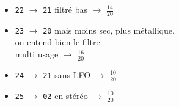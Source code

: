 \documentclass[a4paper, 13pt]{article}
\begin{document}
\begin{itemize}
    \item \texttt{22} $\rightarrow$ \texttt{21} filtré bas $\rightarrow$ \Large{$\frac{14}{20}$} \normalsize \vspace{0.2cm}
    \item \texttt{23} $\rightarrow$ \texttt{20} mais moins sec, plus métallique,\\on entend bien le filtre\\multi usage $\rightarrow$ \Large{$\frac{16}{20}$} \normalsize \vspace{0.2cm}
    \item \texttt{24} $\rightarrow$ \texttt{21} sans LFO $\rightarrow$ \Large{$\frac{10}{20}$} \normalsize \vspace{0.2cm}
    \item \texttt{25} $\rightarrow$ \texttt{02} en stéréo $\rightarrow$ \Large{$\frac{10}{20}$} \normalsize \vspace{0.2cm}
\end{itemize}


\vspace{1cm}
\end{document}
